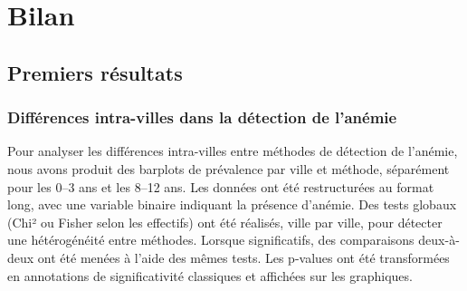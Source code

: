 \documentclass[12pt,a4paper]{article}
\begin{document}
\section{Bilan}
\subsection{Premiers résultats}

\subsubsection{Différences intra-villes dans la détection de l'anémie}

Pour analyser les différences intra-villes entre méthodes de détection de l’anémie, nous avons produit des barplots de prévalence par ville et méthode, séparément pour les 0–3 ans et les 8–12 ans. Les données ont été restructurées au format long, avec une variable binaire indiquant la présence d’anémie. Des tests globaux (Chi² ou Fisher selon les effectifs) ont été réalisés, ville par ville, pour détecter une hétérogénéité entre méthodes. Lorsque significatifs, des comparaisons deux-à-deux ont été menées à l’aide des mêmes tests. Les p-values ont été transformées en annotations de significativité classiques et affichées sur les graphiques.
\end{document}
